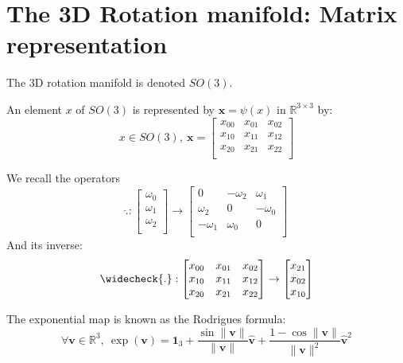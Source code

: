 \section{The 3D Rotation manifold: Matrix representation}
\label{sec:the_3d_rotation_manifold_matrix_representation}

The 3D rotation manifold is denoted $SO(3)$.

An element $x$ of $SO(3)$ is represented by $\mathbf{x}=\psi(x)$ in $\mathbb{R}^{3\times 3}$ by:
\begin{equation}
  x\in SO(3),\ \mathbf{x} =\begin{bmatrix}
    x_{00} & x_{01} & x_{02} \\
    x_{10} & x_{11} & x_{12} \\
    x_{20} & x_{21} & x_{22} \\
  \end{bmatrix}
\end{equation}

We recall the operators
\begin{equation}
\widehat{.}: \begin{bmatrix}
  \omega_0\\\omega_1\\\omega_2\\
\end{bmatrix}
\rightarrow
\begin{bmatrix}
  0 & -\omega_2 & \omega_1 \\
  \omega_2 & 0 & -\omega_0 \\
  -\omega_1 & \omega_0 & 0\\
\end{bmatrix}
\end{equation}
And its inverse:
\begin{equation}
\widecheck{.}: \begin{bmatrix}
    x_{00} & x_{01} & x_{02} \\
    x_{10} & x_{11} & x_{12} \\
    x_{20} & x_{21} & x_{22} \\
\end{bmatrix}
\rightarrow
\begin{bmatrix}
  x_{21}\\x_{02}\\x_{10}\\
\end{bmatrix}
\end{equation}


The exponential map is known as the Rodrigues formula:
\begin{equation}
  \forall \mathbf{v}\in\mathbb{R}^3,\ \exp(\mathbf{v}) = \mathbf{1}_3 +
  \frac{\sin \|\mathbf{v}\|}{\|\mathbf{v}\|} \hat{\mathbf{v}} +
  \frac{1-\cos \|\mathbf{v}\|}{\|\mathbf{v}\|^2} \hat{\mathbf{v}}^2
\end{equation}

